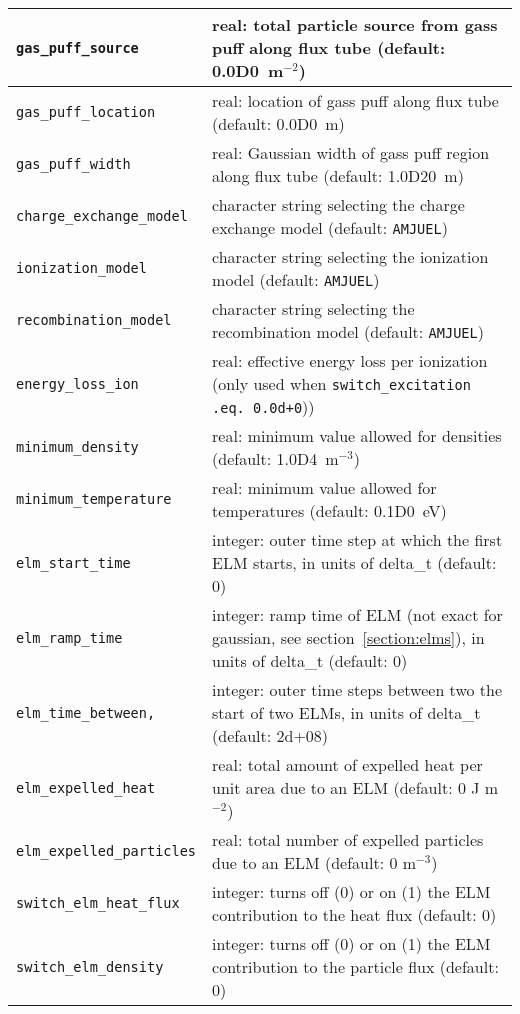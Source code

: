 \documentclass[amsmath,amssymb,a4]{revtex4-2}
\begin{document}
\begin{table}[h]
\begin{center}
\begin{tabular}{|| l  | l ||}
    {\tt gas\_puff\_source}      & real: total particle source from gass puff along flux tube (default: 0.0D0~m$^{-2}$) \\ \hline
    {\tt gas\_puff\_location}    & real: location of gass puff along flux tube (default: 0.0D0~m) \\ \hline
    {\tt gas\_puff\_width}       & real: Gaussian width of gass puff region along flux tube (default: 1.0D20~m) \\ \hline
    {\tt charge\_exchange\_model}& character string selecting the charge exchange model (default: {\tt AMJUEL}) \\ \hline
    {\tt ionization\_model}      & character string selecting the ionization model (default: {\tt AMJUEL}) \\ \hline
    {\tt recombination\_model}   & character string selecting the recombination model (default: {\tt AMJUEL}) \\ \hline
    {\tt energy\_loss\_ion}      & real: effective energy loss per ionization (only used when {\tt switch\_excitation .eq. 0.0d+0})) \\ \hline
    {\tt minimum\_density}       & real: minimum value allowed for densities (default: 1.0D4~m$^{-3}$) \\ \hline
    {\tt minimum\_temperature}   & real: minimum value allowed for temperatures (default: 0.1D0~eV) \\ \hline
    {\tt elm\_start\_time}   	 & integer: outer time step at which the first ELM starts, in units of delta\_t (default: 0) \\ \hline
    {\tt elm\_ramp\_time}   	 & integer: ramp time of ELM (not exact for gaussian, see section~\ref{section:elms}), in units of delta\_t (default: 0) \\ \hline
    {\tt elm\_time\_between,}    & integer: outer time steps between two the start of two ELMs, in units of delta\_t (default: 2d+08) \\ \hline
    {\tt elm\_expelled\_heat}    & real: total amount of expelled heat per unit area due to an ELM (default: 0 J m$^{-2}$) \\ \hline
    {\tt elm\_expelled\_particles}& real: total number of expelled particles due to an ELM (default: 0 m$^{-3}$) \\ \hline
    {\tt switch\_elm\_heat\_flux}& integer: turns off (0) or on (1) the ELM contribution to the heat flux (default: 0) \\ \hline
    {\tt switch\_elm\_density}   & integer: turns off (0) or on (1) the ELM contribution to the particle flux (default: 0) \\ \hline

\end{tabular}
\end{center}
\end{table}
\end{document}
